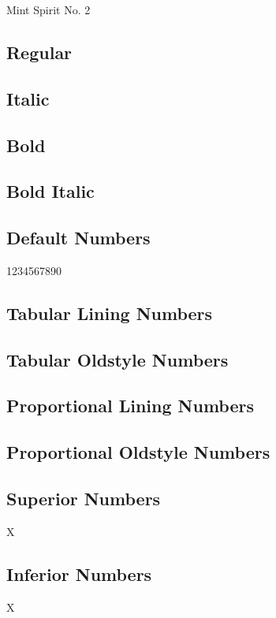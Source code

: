 \documentclass{article}
\begin{document}
\begin{center}\huge
Mint Spirit No. 2
\end{center}

\subsection*{Regular}
\lipsum[1]

\subsection*{Italic}
\textit{\lipsum[2]} 

\subsection*{Bold}
\textbf{\lipsum[3]}

\subsection*{Bold Italic}

\textbf{\textit{\lipsum[4]}}


\subsection*{Default Numbers}

1234567890


\subsection*{Tabular Lining Numbers}


\subsection*{Tabular Oldstyle Numbers}


\subsection*{Proportional Lining Numbers}


\subsection*{Proportional Oldstyle Numbers}


\subsection*{Superior Numbers}

X

\subsection*{Inferior Numbers}

X
\end{document}
